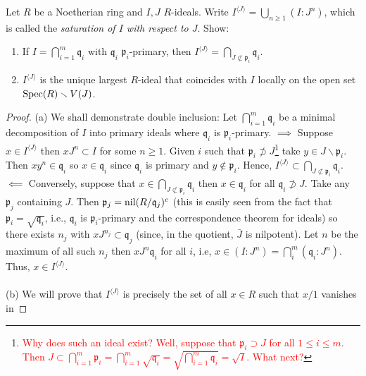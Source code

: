 \begin{problem}
Let $R$ be a Noetherian ring and $I,J$ $R$-ideals. Write
$I^{\langle  J \rangle}=\bigcup_{n\geq 1}(I:J^n)$, which is
called the \emph{saturation of $I$ with respect to $J$}. Show:
\begin{enumerate}[label=(\alph*)]
\item If $I=\bigcap_{i=1}^m\mathfrak{q}_i$ with $\mathfrak{q}_i$
  $\mathfrak{p}_i$-primary, then $I^{\langle
    J\rangle}=\bigcap_{J\nsubset\mathfrak{p}_i}\mathfrak{q}_i$.
\item $I^{\langle  J \rangle}$ is the unique largest $R$-ideal
  that coincides with $I$ locally on the open set
  $\operatorname{Spec}(R)\smallsetminus V(J)$.
\end{enumerate}
\end{problem}
\begin{proof}
(a) We shall demonstrate double inclusion: Let
$\bigcap_{i=1}^m\mathfrak{q}_i$ be a minimal decomposition of $I$ into
primary ideals where $\mathfrak{q}_i$ is
$\mathfrak{p}_i$-primary. $\implies$ Suppose $x\in I^{\langle J\rangle}$
then $xJ^n\subset I$ for some $n\geq 1$. Given $i$ such that
$\mathfrak{p}_i\nsupset J$\footnote{\textcolor{Red}{Why does such
    an ideal exist? Well, suppose that $\mathfrak{p}_i\supset J$
    for all $1\leq i\leq   m$. Then
  $J\subset\bigcap_{i=1}^m\mathfrak{p}_i=\bigcap_{i=1}^m\sqrt{\mathfrak{q}_i}=\sqrt{\bigcap_{i=1}^m\mathfrak{q}_i}=\sqrt{I}$.
What next?}}
take $y\in
J\smallsetminus\mathfrak{p}_i$. Then $xy^n\in\mathfrak{q}_i$ so
$x\in\mathfrak{q}_i$ since $\mathfrak{q}_i$ is primary and
$y\notin\mathfrak{p}_i$. Hence, $I^{\langle
  J\rangle}\subset\bigcap_{J\nsubset\mathfrak{p}_i}\mathfrak{q}_i$. $\impliedby$
Conversely, suppose that
$x\in\bigcap_{J\nsubset\mathfrak{p}_i}\mathfrak{q}_i$ then
$x\in\mathfrak{q}_i$ for all $\mathfrak{q}_i\nsupset J$. Take any
$\mathfrak{p}_j$ containing $J$. Then
$\mathfrak{p}_j=\operatorname{nil}(R/\mathfrak{q}_j)^c$ (this is easily seen
from the fact that $\mathfrak{p}_i=\sqrt{\mathfrak{q}_i}$, i.e.,
$\mathfrak{q}_i$ is $\mathfrak{p}_i$-primary and the
correspondence theorem for ideals) so there exists $n_j$ with
$xJ^{n_j}\subset\mathfrak{q}_j$ (since, in the quotient, $\bar J$
is nilpotent). Let $n$ be the maximum of all such $n_j$ then
$xJ^n\mathfrak{q}_i$ for all $i$, i.e,
$x\in(I:J^n)=\bigcap_{i}^m(\mathfrak{q}_i:J^n)$. Thus, $x\in
I^{\langle  J \rangle}$.
\\\\
(b) We will prove that $I^{\langle  J\rangle}$ is precisely the
set of all $x\in R$ such that $x/1$ vanishes in

\end{proof}
